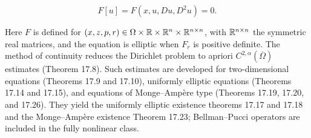 \begin{equation}\label{gt.eq1.11}
F[u] = F(x,u,Du,D^2u) = 0.
\end{equation}

Here $F$ is defined for
$(x,z,p,r)\in\Omega\times\mathbb{R}\times\mathbb{R}^n\times\mathbb{R}^{n\times n}$, with
$\mathbb{R}^{n\times n}$ the symmetric real matrices, and the equation is elliptic when
$F_r$ is positive definite. The method of continuity reduces the Dirichlet
problem to apriori $C^{2,\alpha}(\overline\Omega)$ estimates (Theorem 17.8).
Such estimates are developed for two-dimensional equations (Theorems 17.9 and
17.10), uniformly elliptic equations (Theorems 17.14 and 17.15), and equations
of Monge--Amp\`ere type (Theorems 17.19, 17.20, and 17.26). They yield the
uniformly elliptic existence theorems 17.17 and 17.18 and the Monge--Amp\`ere
existence Theorem 17.23; Bellman--Pucci operators are included in the fully
nonlinear class.

\bigskip

